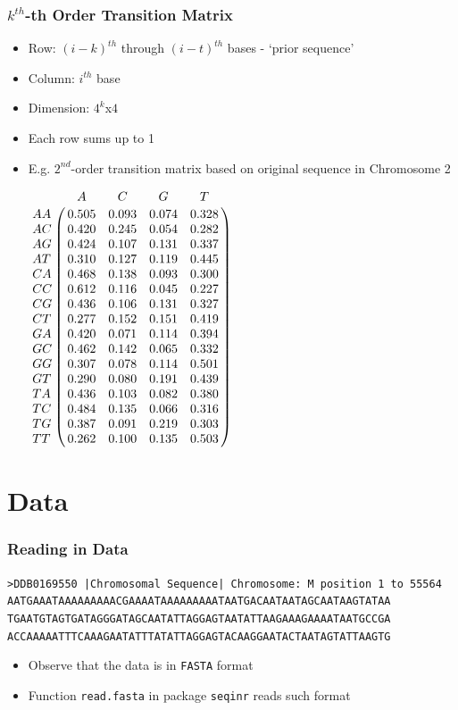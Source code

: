\documentclass[xcolor=dvipsnames]{beamer} \usepackage{beamerthemesplit}
\let\bbordermatrix\bordermatrix
\begin{document}
\begin{frame}
	\frametitle{$k^{th}$-th Order Transition Matrix}
	\begin{itemize}
		\item Row: $(i-k)^{th}$ through $(i-t)^{th}$ bases - `prior sequence'
		\item Column: $i^{th}$ base
		\item Dimension: $4^k$x$4$
		\item Each row sums up to 1
		\item E.g. $2^{nd}$-order transition matrix based on original sequence in Chromosome 2\\
			\begin{center}
			\tiny{
					$
			\bbordermatrix{
			  ~ & A & C & G & T \cr 
			AA & 0.505 & 0.093 & 0.074 & 0.328 \cr
			AC & 0.420 & 0.245 & 0.054 & 0.282 \cr
			AG & 0.424 & 0.107 & 0.131 & 0.337 \cr
			AT & 0.310 & 0.127 & 0.119 & 0.445 \cr
			CA & 0.468 & 0.138 & 0.093 & 0.300 \cr
			CC & 0.612 & 0.116 & 0.045 & 0.227 \cr
			CG & 0.436 & 0.106 & 0.131 & 0.327 \cr
			CT & 0.277 & 0.152 & 0.151 & 0.419 \cr
			GA & 0.420 & 0.071 & 0.114 & 0.394 \cr
			GC & 0.462 & 0.142 & 0.065 & 0.332 \cr
			GG & 0.307 & 0.078 & 0.114 & 0.501 \cr
			GT & 0.290 & 0.080 & 0.191 & 0.439 \cr
			TA & 0.436 & 0.103 & 0.082 & 0.380 \cr
			TC & 0.484 & 0.135 & 0.066 & 0.316 \cr
			TG & 0.387 & 0.091 & 0.219 & 0.303 \cr
			TT & 0.262 & 0.100 & 0.135 & 0.503 \cr
			}$ }
			\end{center}
	\end{itemize}
\end{frame}

\section{Data}
\begin{frame}
	\frametitle{Reading in Data}
	
	\begin{center}
	\begin{raggedright}
	\tiny{
	\texttt{>DDB0169550 |Chromosomal Sequence| Chromosome: M position 1 to 55564}\\
	\texttt{AATGAAATAAAAAAAAACGAAAATAAAAAAAAATAATGACAATAATAGCAATAAGTATAA}\\
	\texttt{TGAATGTAGTGATAGGGATAGCAATATTAGGAGTAATATTAAGAAAGAAAATAATGCCGA}\\
	\texttt{ACCAAAAATTTCAAAGAATATTTATATTAGGAGTACAAGGAATACTAATAGTATTAAGTG} \\ }
	\end{raggedright}
	\end{center}

	\begin{itemize}
	\item Observe that the data is in \texttt{FASTA} format
	\item Function \texttt{read.fasta} in package \texttt{seqinr} reads such format
	
	\end{itemize}

\end{frame}
\end{document}
